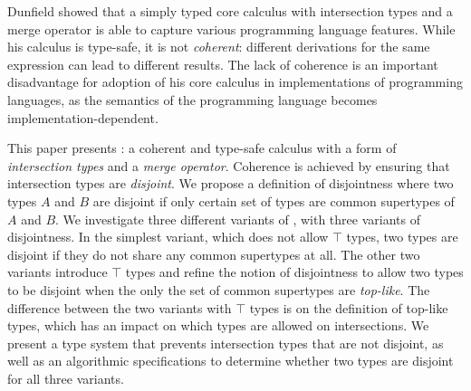 Dunfield showed that a simply typed core calculus with intersection
types and a merge operator is able to capture various programming
language features. While his calculus is type-safe, it is not
\emph{coherent}: different derivations for the same expression can
lead to different results. The lack of coherence is an important
disadvantage for adoption of his core calculus in implementations of
programming languages, as the semantics of the programming language
becomes implementation-dependent.

This paper presents \name: a coherent and type-safe calculus with a
form of \emph{intersection types} and a \emph{merge
operator}. Coherence is achieved by ensuring that intersection types
are \emph{disjoint}. We propose a definition of disjointness where two
types $A$ and $B$ are disjoint if only certain set of types are common
supertypes of $A$ and $B$. We investigate three different variants of
\name, with three variants of disjointness. In the simplest
variant, which does not allow $\top$ types, two types are disjoint if
they do not share any common supertypes at all. The other two variants
introduce $\top$ types and refine the notion of disjointness to allow
two types to be disjoint when the only the set of common supertypes are
\emph{top-like}. The difference between the two variants with $\top$
types is on the definition of top-like types, which has an impact on
which types are allowed on intersections. We present a type system
that prevents intersection types that are not disjoint, as well as an
algorithmic specifications to determine whether two types are disjoint
for all three variants.